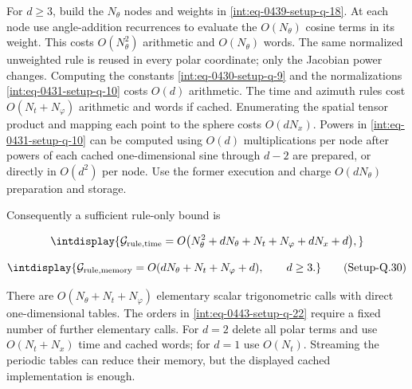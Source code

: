 For \(d\ge3\), build the \(N_\theta\) nodes and weights in \hyperref[int:eq-setup-q-18]{\eqref{int:eq-0439-setup-q-18}}. At each node use angle-addition recurrences to evaluate the \(O(N_\theta)\) cosine terms in its weight. This costs \(O(N_\theta^2)\) arithmetic and \(O(N_\theta)\) words. The same normalized unweighted rule is reused in every polar coordinate; only the Jacobian power changes. Computing the constants \hyperref[int:eq-setup-q-9]{\eqref{int:eq-0430-setup-q-9}} and the normalizations \hyperref[int:eq-setup-q-10]{\eqref{int:eq-0431-setup-q-10}} costs \(O(d)\) arithmetic. The time and azimuth rules cost \(O(N_t+N_\varphi)\) arithmetic and words if cached. Enumerating the spatial tensor product and mapping each point to the sphere costs \(O(dN_x)\). Powers in \hyperref[int:eq-setup-q-10]{\eqref{int:eq-0431-setup-q-10}} can be computed using \(O(d)\) multiplications per node after powers of each cached one-dimensional sine through \(d-2\) are prepared, or directly in \(O(d^2)\) per node. Use the former execution and charge \(O(dN_\theta)\) preparation and storage.



Consequently a sufficient rule-only bound is


\begingroup\renewcommand{\theHequation}{intdisplay.903}
\begin{equation*}
\intdisplay{
\mathcal G_{\rm rule,time}
=O\bigl(N_\theta^2+dN_\theta+N_t+N_\varphi+dN_x+d\bigr),
}
\end{equation*}
\endgroup

\label{int:eq-setup-q-30}
\begingroup\renewcommand{\theHequation}{intdisplay.904}
\begin{equation}
\intdisplay{
\mathcal G_{\rm rule,memory}
=O(dN_\theta+N_t+N_\varphi+d),\qquad d\ge3.
}
\tag{Setup-Q.30}
\label{int:eq-0451-setup-q-30}
\end{equation}
\endgroup


There are \(O(N_\theta+N_t+N_\varphi)\) elementary scalar trigonometric calls with direct one-dimensional tables. The orders in \hyperref[int:eq-setup-q-22]{\eqref{int:eq-0443-setup-q-22}} require a fixed number of further elementary calls. For \(d=2\) delete all polar terms and use \(O(N_t+N_x)\) time and cached words; for \(d=1\) use \(O(N_t)\). Streaming the periodic tables can reduce their memory, but the displayed cached implementation is enough.


